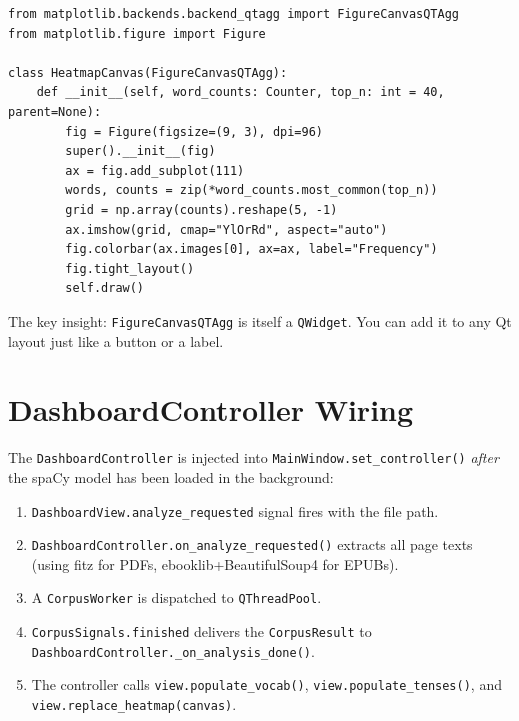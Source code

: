 \documentclass[12pt,oneside]{book}
\begin{document}
\begin{lstlisting}[caption={HeatmapCanvas embedded in Qt (LLR-17, LLR-18)}]
from matplotlib.backends.backend_qtagg import FigureCanvasQTAgg
from matplotlib.figure import Figure

class HeatmapCanvas(FigureCanvasQTAgg):
    def __init__(self, word_counts: Counter, top_n: int = 40, parent=None):
        fig = Figure(figsize=(9, 3), dpi=96)
        super().__init__(fig)
        ax = fig.add_subplot(111)
        words, counts = zip(*word_counts.most_common(top_n))
        grid = np.array(counts).reshape(5, -1)
        ax.imshow(grid, cmap="YlOrRd", aspect="auto")
        fig.colorbar(ax.images[0], ax=ax, label="Frequency")
        fig.tight_layout()
        self.draw()
\end{lstlisting}

The key insight: \texttt{FigureCanvasQTAgg} is itself a \texttt{QWidget}.
You can add it to any Qt layout just like a button or a label.

\section{DashboardController Wiring}

The \texttt{DashboardController} is injected into \texttt{MainWindow.set\_controller()}
\textit{after} the spaCy model has been loaded in the background:

\begin{enumerate}
  \item \texttt{DashboardView.analyze\_requested} signal fires with the file path.
  \item \texttt{DashboardController.on\_analyze\_requested()} extracts all page texts
    (using fitz for PDFs, ebooklib+BeautifulSoup4 for EPUBs).
  \item A \texttt{CorpusWorker} is dispatched to \texttt{QThreadPool}.
  \item \texttt{CorpusSignals.finished} delivers the \texttt{CorpusResult} to
    \texttt{DashboardController.\_on\_analysis\_done()}.
  \item The controller calls \texttt{view.populate\_vocab()},
    \texttt{view.populate\_tenses()}, and \texttt{view.replace\_heatmap(canvas)}.
\end{enumerate}

\end{document}
